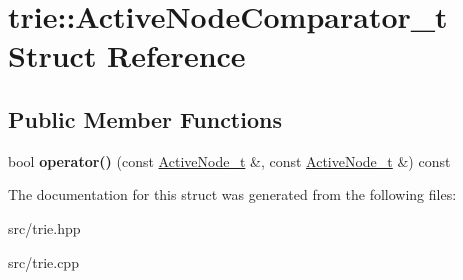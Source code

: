 \hypertarget{structtrie_1_1ActiveNodeComparator__t}{}\section{trie\+:\+:Active\+Node\+Comparator\+\_\+t Struct Reference}
\label{structtrie_1_1ActiveNodeComparator__t}
\subsection*{Public Member Functions}
\begin{DoxyCompactItemize}
\item 
bool {\bfseries operator()} (const \hyperlink{structtrie_1_1ActiveNode__t}{Active\+Node\+\_\+t} \&, const \hyperlink{structtrie_1_1ActiveNode__t}{Active\+Node\+\_\+t} \&) const \hypertarget{structtrie_1_1ActiveNodeComparator__t_ac7b71aa239b687b42286f09c332415ac}{}\label{structtrie_1_1ActiveNodeComparator__t_ac7b71aa239b687b42286f09c332415ac}

\end{DoxyCompactItemize}


The documentation for this struct was generated from the following files\+:\begin{DoxyCompactItemize}
\item 
src/trie.\+hpp\item 
src/trie.\+cpp\end{DoxyCompactItemize}
